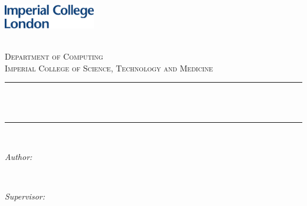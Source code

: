 \begin{titlepage}

    \newcommand{\HRule}{\rule{\linewidth}{0.5mm}} %
    
    
    \includegraphics[width = 4cm]{../figures/imperial.pdf}\\[0.5cm] 
    
    \center %
     
    
    \textsc{\LARGE \reporttype}\\[1.5cm] 
    \textsc{\Large Department of Computing}\\[0.5cm] 
    \textsc{\large Imperial College of Science, Technology and Medicine}\\[0.5cm] 
    
    
    \HRule \\[0.4cm]
    { \huge \bfseries \reporttitle}\\ %
    \HRule \\[1.5cm]
     
    
    \begin{minipage}{0.4\textwidth}
    \begin{flushleft} \large
    \emph{Author:}\\
    \reportauthor %
    \end{flushleft}
    \end{minipage}
    ~
    \begin{minipage}{0.4\textwidth}
    \begin{flushright} \large
    \emph{Supervisor:} \\
    \supervisor %
    \end{flushright}
    \end{minipage}\\[4cm]
    

\end{titlepage}
